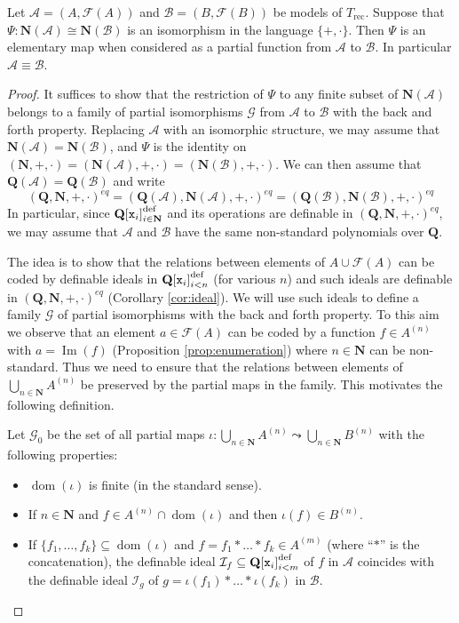 \documentclass[10pt,a4paper]{amsart}
\newcommand{\A}{\mathcal A}
\newcommand{\B}{\mathcal B}
\newcommand{\F}{\mathcal{F}}
\newcommand{\Poly}{{\hQ[{\tt x}_i]}_{i\in \hn}^{\text{def}}}
\newcommand{\ca}{\mathcal}
\newcommand{\dom}{\operatorname{dom}}
\newcommand{\hQ}{\mathbf Q}
\newcommand{\hn}{\mathbf N}
\newcommand{\ideal}[1]{\ca #1}
\newcommand{\img}{\operatorname{Im}}
\newcommand{\poly}[1]{{\hQ[{\tt x}_i]}_{i<#1}^\text{def}}
\newcommand{\pto}{\leadsto} %
\begin{document}
\begin{lem} \label{lem:main} Let $\mathcal A= (A, \F (A))$ and $\mathcal B = (B, \F(B))$ be models of $T_{\text{rec}}$. Suppose that $\Psi: \hn(\ca A) \cong \hn (\ca B)$ is an isomorphism in the language $\{+,\cdot\}$. Then $\Psi$ is an elementary map when considered as a partial function from $\ca A$ to $\ca B$. In particular $\ca A \equiv \ca B$. 
\end{lem} 

\begin{proof} It suffices to show that the restriction of $\Psi$ to any finite subset of $\hn (\ca A)$ belongs to a family of partial isomorphisms $\ca G$ from $\ca A$ to $\ca B$
 with the back and forth property. Replacing $\ca A$ with an isomorphic structure, we may assume that $\hn(\ca A) = \hn(\ca B)$, and $\Psi$ is the identity on $(\hn,+,\cdot) = (\hn (\ca A),+,\cdot) = (\hn (\ca B),+,\cdot)$. 
We can then assume that $\hQ(\ca A) = \hQ(\ca B)$ and 
write
%
$$(\hQ, \hn, +, \cdot)^{eq} = (\hQ(\ca A), \hn (\A), +,\cdot)^{eq} = (\hQ(\ca B), \hn (\B), +,\cdot)^{eq}$$
%
In particular, since $\Poly$ and its operations are definable in $(\hQ, \hn, +,\cdot)^{eq}$, we may assume that $\ca A$ and $\ca B$ have the same non-standard polynomials over $\hQ$. 

The idea is to show that the relations between elements of $A\cup \F(A)$ can be coded by definable ideals in $\poly n$ (for various $n$) and such ideals are definable in $(\hQ,\hn, +, \cdot)^{eq}$ (Corollary \ref{cor:ideal}). We will use such ideals to define a family $\ca G$ of partial isomorphisms with the back and forth property. 
To this aim we observe that an element $a \in \F(A)$ can be coded by a function $f\in A^{(n)}$ with $a = \img(f)$ (Proposition \ref{prop:enumeration}) where $n\in \hn$ can be non-standard. Thus we need to ensure that the relations between elements of   $\bigcup_{n \in \hn} A^{(n)}$ be preserved by the partial maps in the family. This motivates the following definition. 

Let $\ca G_0$ be the set of all partial maps $\iota : \bigcup_{n \in \hn} A^{(n)} \pto \bigcup_{n\in \hn} B^{(n)}$ with the following properties: 
\begin{itemize}
\item $\dom(\iota)$ is finite (in the standard sense). 
\item If $n\in \hn$ and $f\in A^{(n)} \cap \dom(\iota)$ and then $\iota(f) \in B^{(n)}$. 
\item If $\{f_1, \ldots, f_k\} \subseteq \dom(\iota)$ and $f = f_1*\ldots *f_k \in A^{(m)}$ (where ``$*$'' is the concatenation), the definable ideal ${\ideal I}_f \subseteq \poly m$ of $f$ in $\ca A$ coincides with the definable ideal ${\ideal I}_g$ of $g = \iota(f_1)*\ldots * \iota(f_k)$ in $\ca B$. 
\end{itemize}


\end{proof}
\end{document}
